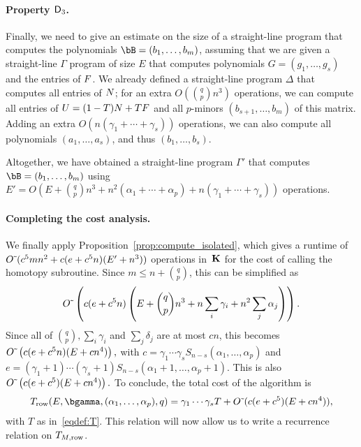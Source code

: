 \documentclass[12pt]{article}
\begin{document}
\paragraph{Property $\mathsf{D}_3$.} Finally, we need to give an estimate on
the size of a straight-line program that computes the polynomials
$\bB=(b_1,\dots,b_m)$, assuming that we are given a straight-line
$\Gamma$ program of size $E$ that computes polynomials
$G=(g_1,\dots,g_s)$ and the entries of ${F}$. We already defined a
straight-line program $\Delta$ that computes all entries of ${N}$; for
an extra $O({q \choose p} n^3)$ operations, we can compute all entries
of ${U}=(1-T){N}+T{F}$ and all $p$-minors $(b_{s+1},\dots,b_m)$ of
this matrix.  Adding an extra $O(n(\gamma_1 + \cdots + \gamma_s))$
operations, we can also compute all polynomials $(a_1,\dots,a_s)$, and
thus $(b_1,\dots,b_s)$.

Altogether, we have obtained a straight-line program $\Gamma'$ that
computes $\bB=(b_1,\dots,b_m)$ using $E'=O(E + {q \choose p} n^3 + n^2
(\alpha_1+\cdots+\alpha_p) + n(\gamma_1 + \cdots + \gamma_s))$ operations.

\paragraph{Completing the cost analysis.} We finally apply Proposition~\ref{prop:compute_isolated},
which gives a runtime of ${O}{\,\tilde{ }\,}(c^5 m n^2 + c(e+c^5 n)(E' + n^3))$
operations in~$\mathbf{K}$ for the cost of calling the homotopy
subroutine. Since $m \le n + {q \choose p}$, this can be simplified as
$${O}{\,\tilde{ }\,}\left (c(e+c^5 n)\left(E + {q \choose p} n^3 +n \sum_i
    \gamma_i + n^2 \sum_j \alpha_j\right)\right).$$
Since all of $ {q \choose p}, \sum_i \gamma_i$ and $\sum_j \delta_j$
are at most $cn$, this becomes
${O}{\,\tilde{ }\,}\left (c(e+c^5 n)(E + cn^4)\right),$ with
$c=\gamma_1\cdots\gamma_sS_{n-s}(\alpha_1,\dots,\alpha_p)$  and
$e=(\gamma_1+1)\cdots(\gamma_s+1)S_{n-s}(\alpha_1+1,\dots,\alpha_p+1)$.  This is also
${O}{\,\tilde{ }\,}\left (c(e+c^5 )(E + cn^4)\right).$ To conclude, the 
total cost of the algorithm is
\begin{align}\label{eq:recT}
T_{\rm row}(E,\bgamma,(\alpha_1,\dots,\alpha_p),q)= \gamma_1 \cdots\gamma_s T + \softO( c(e+c^5 )(E + cn^4)),  
\end{align}
with $T$ as in~\eqref{eqdef:T}. This relation will now allow us to
write a recurrence relation on $T_{M,{\rm row}}$.
\end{document}
